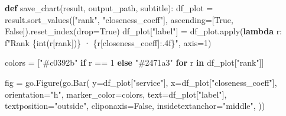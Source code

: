 \documentclass[
  12pt,
  letterpaper,
  12pt,
  oneside,
  english,
  onehalfspacing,
  headsepline]{MastersDoctoralThesis}
\newenvironment{Shaded}{\begin{snugshade}}{\end{snugshade}}
\newcommand{\BuiltInTok}[1]{\textcolor[rgb]{0.00,0.23,0.31}{#1}}
\newcommand{\ControlFlowTok}[1]{\textcolor[rgb]{0.00,0.23,0.31}{\textbf{#1}}}
\newcommand{\DecValTok}[1]{\textcolor[rgb]{0.68,0.00,0.00}{#1}}
\newcommand{\KeywordTok}[1]{\textcolor[rgb]{0.00,0.23,0.31}{\textbf{#1}}}
\newcommand{\NormalTok}[1]{\textcolor[rgb]{0.00,0.23,0.31}{#1}}
\newcommand{\OperatorTok}[1]{\textcolor[rgb]{0.37,0.37,0.37}{#1}}
\newcommand{\SpecialCharTok}[1]{\textcolor[rgb]{0.37,0.37,0.37}{#1}}
\newcommand{\SpecialStringTok}[1]{\textcolor[rgb]{0.13,0.47,0.30}{#1}}
\newcommand{\StringTok}[1]{\textcolor[rgb]{0.13,0.47,0.30}{#1}}
\newcommand{\VariableTok}[1]{\textcolor[rgb]{0.07,0.07,0.07}{#1}}
\begin{document}
\begin{Shaded}
\begin{Highlighting}[]
\KeywordTok{def}\NormalTok{ save\_chart(result, output\_path, subtitle):}
\NormalTok{    df\_plot }\OperatorTok{=}\NormalTok{ result.sort\_values([}\StringTok{"rank"}\NormalTok{, }\StringTok{"closeness\_coeff"}\NormalTok{], ascending}\OperatorTok{=}\NormalTok{[}\VariableTok{True}\NormalTok{, }\VariableTok{False}\NormalTok{]).reset\_index(drop}\OperatorTok{=}\VariableTok{True}\NormalTok{)}
\NormalTok{    df\_plot[}\StringTok{"label"}\NormalTok{] }\OperatorTok{=}\NormalTok{ df\_plot.}\BuiltInTok{apply}\NormalTok{(}\KeywordTok{lambda}\NormalTok{ r: }\SpecialStringTok{f"Rank }\SpecialCharTok{\{}\BuiltInTok{int}\NormalTok{(r[}\StringTok{\textquotesingle{}rank\textquotesingle{}}\NormalTok{])}\SpecialCharTok{\}}\SpecialStringTok{ · }\SpecialCharTok{\{}\NormalTok{r[}\StringTok{\textquotesingle{}closeness\_coeff\textquotesingle{}}\NormalTok{]}\SpecialCharTok{:.4f\}}\SpecialStringTok{"}\NormalTok{, axis}\OperatorTok{=}\DecValTok{1}\NormalTok{)}

\NormalTok{    colors }\OperatorTok{=}\NormalTok{ [}\StringTok{"\#c0392b"} \ControlFlowTok{if}\NormalTok{ r }\OperatorTok{==} \DecValTok{1} \ControlFlowTok{else} \StringTok{"\#2471a3"} \ControlFlowTok{for}\NormalTok{ r }\KeywordTok{in}\NormalTok{ df\_plot[}\StringTok{"rank"}\NormalTok{]]}

\NormalTok{    fig }\OperatorTok{=}\NormalTok{ go.Figure(go.Bar(}
\NormalTok{        y}\OperatorTok{=}\NormalTok{df\_plot[}\StringTok{"service"}\NormalTok{],}
\NormalTok{        x}\OperatorTok{=}\NormalTok{df\_plot[}\StringTok{"closeness\_coeff"}\NormalTok{],}
\NormalTok{        orientation}\OperatorTok{=}\StringTok{"h"}\NormalTok{,}
\NormalTok{        marker\_color}\OperatorTok{=}\NormalTok{colors,}
\NormalTok{        text}\OperatorTok{=}\NormalTok{df\_plot[}\StringTok{"label"}\NormalTok{],}
\NormalTok{        textposition}\OperatorTok{=}\StringTok{"outside"}\NormalTok{,}
\NormalTok{        cliponaxis}\OperatorTok{=}\VariableTok{False}\NormalTok{,}
\NormalTok{        insidetextanchor}\OperatorTok{=}\StringTok{"middle"}\NormalTok{,}
\NormalTok{    ))}


\end{Highlighting}
\end{Shaded}
\end{document}
